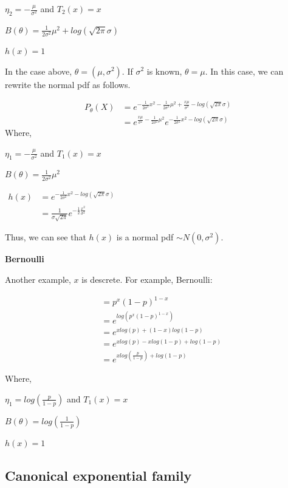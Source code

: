 \documentclass[]{book}
\begin{document}
\(\eta_2 =-\frac{\mu}{\sigma^2}\) and \(T_2(x)=x\)

\(B(\theta)=\frac{1}{2\sigma^2} \mu^2+log(\sqrt{2\pi}\sigma)\)

\(h(x)=1\)

In the case above, \(\theta=(\mu, \sigma^2)\). If \(\sigma^2\) is known, \(\theta=\mu\). In this case, we can rewrite the normal pdf as follows.

\[\begin{aligned} P_{\theta}(X) &=e^{-\frac{1}{2\sigma^2}x^2-\frac{1}{2\sigma^2} \mu^2+\frac{x\mu}{\sigma^2}-log(\sqrt{2\pi}\sigma)}\\ &=e^{\frac{x\mu}{\sigma^2}-\frac{1}{2\sigma^2} \mu^2}e^{-\frac{1}{2\sigma^2}x^2-log(\sqrt{2\pi}\sigma)} \end{aligned}\]
Where,

\(\eta_1 =-\frac{\mu}{\sigma^2}\) and \(T_1(x)=x\)

\(B(\theta)=\frac{1}{2\sigma^2} \mu^2\)

\(\begin{aligned} h(x) &=e^{-\frac{1}{2\sigma^2}x^2-log(\sqrt{2\pi}\sigma)} \\&=\frac{1}{\sigma\sqrt{2\pi}}e^{-\frac{1}{2}\frac{x^2}{\sigma^2}} \end{aligned}\)

Thus, we can see that \(h(x)\) is a normal pdf \(\sim N(0, \sigma^2)\).

\textbf{Bernoulli}

Another example, \(x\) is descrete. For example, Bernoulli:

\[ \begin{aligned} &= p^x(1-p)^{1-x}  \\ &=e^{log(p^x(1-p)^{1-x})} \\ &= e^{xlog(p)+(1-x)log(1-p)}\\ &= e^{xlog(p)-xlog(1-p)+log(1-p)}\\ &=e^{xlog(\frac{p}{1-p})+log(1-p)} \end{aligned}\]

Where,

\(\eta_1 =log(\frac{p}{1-p})\) and \(T_1(x)=x\)

\(B(\theta)=log(\frac{1}{1-p})\)

\(h(x) =1\)

\hypertarget{canonical-exponential-family}{%
\subsection{Canonical exponential family}\label{canonical-exponential-family}}
\end{document}
